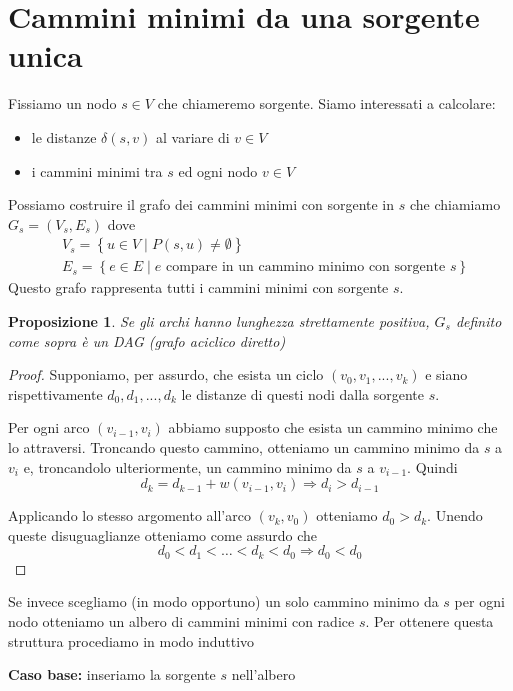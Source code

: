 \documentclass[a4paper,10pt]{amsbook}
\newcounter{counter1}
\theoremstyle{plain}
\newtheorem{mypro}[counter1]{Proposizione}
\theoremstyle{definition}
\theoremstyle{remark}
\newcommand{\set}[1]{\left\{#1\right\}}
\newcommand{\pa}[1]{\left(#1\right)}
\begin{document}
\section{Cammini minimi da una sorgente unica}

Fissiamo un nodo $s \in V$ che chiameremo sorgente. Siamo interessati
a calcolare:
\begin{itemize}
\item le distanze $\delta(s,v)$ al variare di $v\in V$
\item i cammini minimi tra $s$ ed ogni nodo $v\in V$
\end{itemize}

Possiamo costruire il grafo dei cammini minimi con sorgente in $s$ che
chiamiamo $G_s = (V_s,E_s)$ dove
\begin{align*}
  &V_s = \set{ u\in V \mid P(s,u) \neq \emptyset } \\
 &E_s = \set{ e\in E \mid e\text{ compare in un cammino minimo con
    sorgente }s}
\end{align*}
Questo grafo rappresenta tutti i cammini minimi con sorgente $s$.

\begin{mypro}
  Se gli archi hanno lunghezza strettamente positiva, $G_s$ definito
  come sopra è un DAG (grafo aciclico diretto)
\end{mypro}
\begin{proof}
  Supponiamo, per assurdo, che esista un ciclo $(v_0,v_1,...,v_k)$ e
  siano rispettivamente $d_0,d_1,...,d_k$ le distanze di questi nodi
  dalla sorgente $s$.

  Per ogni arco $(v_{i-1},v_i)$ abbiamo supposto che esista un cammino
  minimo che lo attraversi. Troncando questo cammino, otteniamo un
  cammino minimo da $s$ a $v_i$ e, troncandolo ulteriormente, un
  cammino minimo da $s$ a $v_{i-1}$. Quindi
  \[ d_k = d_{k-1} + w\pa{ v_{i-1} , v_i  } \Rightarrow d_i >
  d_{i-1} \]
  
  Applicando lo stesso argomento all'arco $(v_k,v_0)$ otteniamo $d_0 >
  d_k$. Unendo queste disuguaglianze otteniamo come assurdo che
  \[ d_0 < d_1 < \dots < d_k < d_0 \Rightarrow d_0 < d_0 \]
\end{proof}

Se invece scegliamo (in modo opportuno) un solo cammino minimo da $s$
per ogni nodo otteniamo un albero di cammini minimi con radice
$s$. Per ottenere questa struttura procediamo in modo induttivo

\textbf{Caso base:} inseriamo la sorgente $s$ nell'albero
\end{document}
